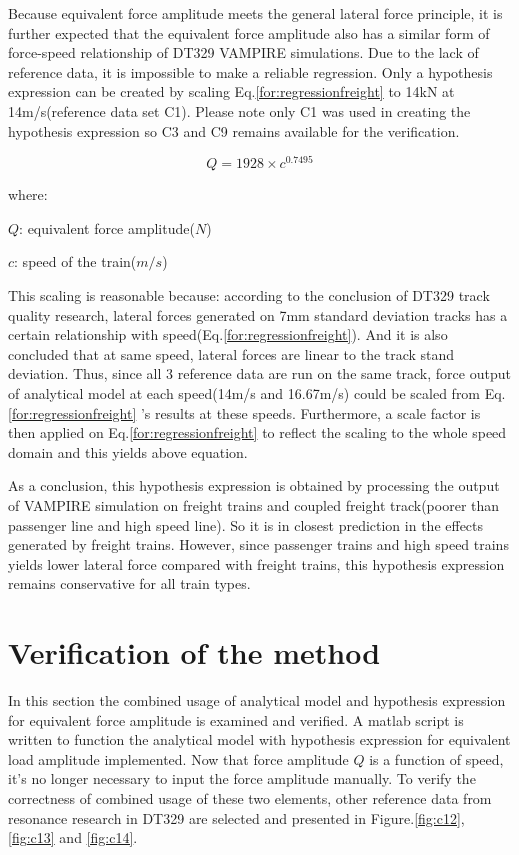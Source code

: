 Because equivalent force amplitude meets the general lateral force principle, it is further expected that the equivalent force amplitude also has a similar form of force-speed relationship of DT329 VAMPIRE simulations. Due to the lack of reference data, it is impossible to make a reliable regression. Only a hypothesis expression can be created by scaling Eq.\ref{for:regressionfreight} to 14kN at 14m/s(reference data set C1). Please note only C1 was used in creating the hypothesis expression so C3 and C9 remains available for the verification.

\begin{equation}
    Q= 1928\times c^{0.7495}
\end{equation}

where:

$Q$: equivalent force amplitude($N$)

$c$: speed of the train($m/s$)

This scaling is reasonable because: according to the conclusion of DT329 track quality research, lateral forces generated on 7mm standard deviation tracks has a certain relationship with speed(Eq.\ref{for:regressionfreight}). And it is also concluded that at same speed, lateral forces are linear to the track stand deviation. Thus, since all 3 reference data are run on the same track, force output of analytical model at each speed(14m/s and 16.67m/s) could be scaled from Eq.\ref{for:regressionfreight} 's results at these speeds. Furthermore, a scale factor is then applied on Eq.\ref{for:regressionfreight} to reflect the scaling to the whole speed domain and this yields above equation.

As a conclusion, this hypothesis expression is obtained by processing the output of VAMPIRE simulation on freight trains and coupled freight track(poorer than passenger line and high speed line). So it is in closest prediction in the effects generated by freight trains. However, since passenger trains and high speed trains yields lower lateral force compared with freight trains, this hypothesis expression remains conservative for all train types.

\section{Verification of the method}

In this section the combined usage of analytical model and hypothesis expression for equivalent force amplitude is examined and verified. A matlab script is written to function the analytical model with hypothesis expression for equivalent load amplitude implemented. Now that force amplitude $Q$ is a function of speed, it's no longer necessary to input the force amplitude manually. To verify the correctness of combined usage of these two elements, other reference data from resonance research in DT329 are selected and presented in Figure.\ref{fig:c12}, \ref{fig:c13} and \ref{fig:c14}. 

